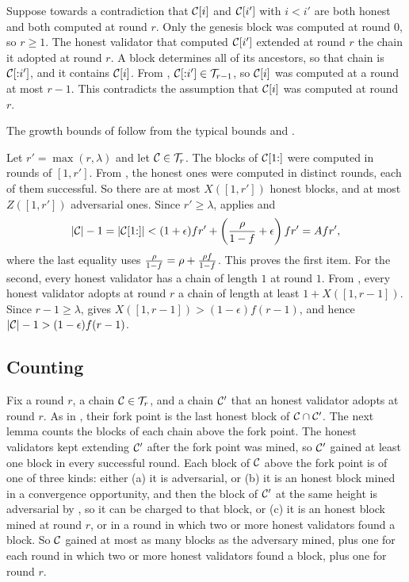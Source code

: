 \begin{proofof}{}
    Suppose towards a contradiction that $\mathcal{C}[i]$ and $\mathcal{C}[i']$ with $i<i'$ are
    both honest and both computed at round $r$. Only the genesis block was
    computed at round $0$, so $r\ge1$. The honest validator that computed
    $\mathcal{C}[i']$ extended at round $r$ the chain it adopted at round $r$. A block
    determines all of its ancestors, so that chain is $\mathcal{C}[{:}i']$, and it
    contains $\mathcal{C}[i]$. From , $\mathcal{C}[{:}i']\in\mathcal{T}_{r-1}$,
    so $\mathcal{C}[i]$ was computed at a round at most $r-1$. This contradicts the
    assumption that $\mathcal{C}[i]$ was computed at round $r$.
\end{proofof}

The growth bounds of  follow from the typical bounds and
.

\begin{proofof}{}
    Let $r'=\max(r,\lambda)$ and let $\mathcal{C}\in\mathcal{T}_r$. The blocks of $\mathcal{C}[1{:}]$
    were computed in rounds of $[1,r']$. From , the honest
    ones were computed in distinct rounds, each of them successful. So there
    are at most $X([1,r'])$ honest blocks, and at most $Z([1,r'])$ adversarial
    ones. Since $r'\ge\lambda$,  applies and
    \[
        \lvert \mathcal{C}\rvert-1 = \lvert \mathcal{C}[1{:}]\rvert <
            (1+\epsilon)fr'+\left(\frac{\rho}{1-f}+\epsilon\right)fr' = A f r',
    \]
    where the last equality uses $\frac{\rho}{1-f}=\rho+\frac{\rho f}{1-f}$.
    This proves the first item. For the second, every honest validator has a
    chain of length $1$ at round $1$. From , every honest
    validator adopts at round $r$ a chain of length at least $1+X([1,r-1])$.
    Since $r-1\ge\lambda$,  gives $X([1,r-1])>(1-\epsilon)f(r-1)$,
    and hence $\lvert \mathcal{C}\rvert-1>(1-\epsilon)f(r-1)$.
\end{proofof}

\subsection{Counting}

Fix a round $r$, a chain $\mathcal{C}\in\mathcal{T}_r$, and a chain $\mathcal{C}'$ that an honest
validator adopts at round $r$. As in , their fork point
is the last honest block of $\mathcal{C}\cap\mathcal{C}'$. The next lemma counts the blocks of
each chain above the fork point. The honest validators kept extending $\mathcal{C}'$
after the fork point was mined, so $\mathcal{C}'$ gained at least one block in every
successful round. Each block of $\mathcal{C}$ above the fork point is of one of three
kinds: either (a) it is adversarial, or (b) it is an honest block mined in a
convergence opportunity, and then the block of $\mathcal{C}'$ at the same height is
adversarial by , so it can be charged to that block, or (c) it
is an honest block mined at round $r$, or in a round in which two or more honest
validators found a block. So $\mathcal{C}$ gained at most as many blocks as the
adversary mined, plus one for each round in which two or more honest validators
found a block, plus one for round $r$.

